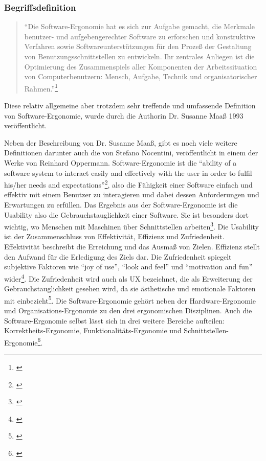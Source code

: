 \subsubsection{Begriffsdefinition}
\begin{quote}
    \enquote{Die Software-Ergonomie hat es sich zur Aufgabe gemacht, die Merkmale benutzer- und aufgebengerechter Software zu erforschen und konstruktive Verfahren sowie Softwareunterstützungen für den Prozeß der Gestaltung von Benutzungsschnittstellen zu entwickeln. Ihr zentrales Anliegen ist die Optimierung des Zusammenspiels aller Komponenten der Arbeitssituation von Computerbenutzern: Mensch, Aufgabe, Technik und organisatorischer Rahmen.}\footnote{\cite[191]{Maass1993}}
\end{quote}
Diese relativ allgemeine aber trotzdem sehr treffende und umfassende Definition von Software-Ergonomie, wurde durch die Authorin Dr. Susanne Maaß 1993 veröffentlicht. 

Neben der Beschreibung von Dr. Susanne Maaß, gibt es noch viele weitere Definitionen darunter auch die von Stefano Nocentini, veröffentlicht in einem der Werke von Reinhard Oppermann. Software-Ergonomie ist die \enquote{ability of a software system to interact easily and effectively with the user in order to fulfil his/her needs and expectations}\footnote{\cite[4]{Oppermann1988einfuehrung}}, also die Fähigkeit einer Software einfach und effektiv mit einem Benutzer zu interagieren und dabei dessen Anforderungen und Erwartungen zu erfüllen. Das Ergebnis aus der Software-Ergonomie ist die Usability also die Gebrauchstauglichkeit einer Software. Sie ist besonders dort wichtig, wo Menschen mit Maschinen über Schnittstellen arbeiten\footnote{\cite[vgl.][]{usabilityDe}}. Die Usability ist der Zusammenschluss von Effektivität, Effizienz und Zufriedenheit. Effektivität beschreibt die Erreichung und das Ausmaß von Zielen. Effizienz stellt den Aufwand für die Erledigung des Ziels dar. Die Zufriedenheit spiegelt subjektive Faktoren wie \enquote{joy of use}, \enquote{look and feel} und \enquote{motivation and fun} wider\footnote{\cite[vgl.][4\psq]{Holzinger2011human}}. Die Zufriedenheit wird auch als \gls{UX} bezeichnet, die als Erweiterung der Gebrauchstauglichkeit gesehen wird, da sie ästhetische und emotionale Faktoren mit einbezieht\footnote{\cite[vgl.][]{usabilityDe}}. Die Software-Ergonomie gehört neben der Hardware-Ergonomie und Organisations-Ergonomie zu den drei ergonomischen Disziplinen. Auch die Software-Ergonomie selbst lässt sich in drei weitere Bereiche aufteilen: Korrektheits-Ergonomie, Funktionalitäts-Ergonomie und Schnittstellen-Ergonomie\footnote{\cite[vgl.][]{Oppermann1988einfuehrung}}.

